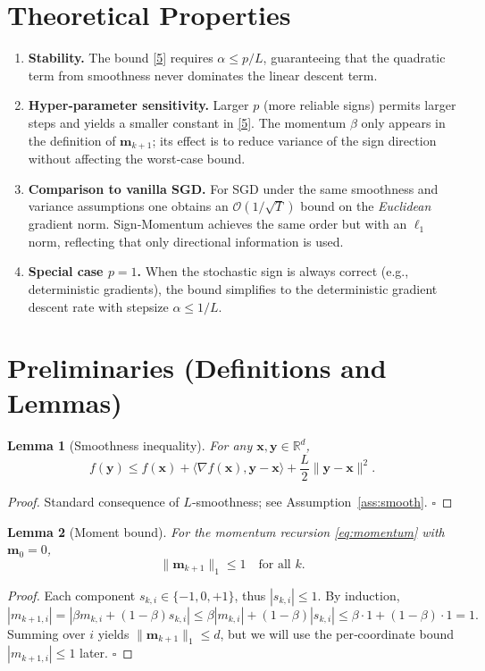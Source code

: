 \documentclass{article}
\newtheorem{lemma}{Lemma}
\begin{document}
\section*{Theoretical Properties}
\begin{enumerate}[label=\arabic*.]
\item \textbf{Stability.} The bound \eqref{5} requires $\alpha\le p/L$, guaranteeing that the quadratic term from smoothness never dominates the linear descent term.
\item \textbf{Hyper‑parameter sensitivity.} Larger $p$ (more reliable signs) permits larger steps and yields a smaller constant in \eqref{5}. The momentum $\beta$ only appears in the definition of $\mathbf{m}_{k+1}$; its effect is to reduce variance of the sign direction without affecting the worst‑case bound.
\item \textbf{Comparison to vanilla SGD.} For SGD under the same smoothness and variance assumptions one obtains an $\mathcal{O}(1/\sqrt{T})$ bound on the \emph{Euclidean} gradient norm. Sign‑Momentum achieves the same order but with an $\ell_{1}$ norm, reflecting that only directional information is used.
\item \textbf{Special case $p=1$.} When the stochastic sign is always correct (e.g., deterministic gradients), the bound simplifies to the deterministic gradient descent rate with stepsize $\alpha\le 1/L$.
\end{enumerate}

\section*{Preliminaries (Definitions and Lemmas)}
\begin{lemma}[Smoothness inequality]\label{lem:smooth}
For any $\mathbf{x},\mathbf{y}\in\mathbb{R}^{d}$,
\[
f(\mathbf{y})\le f(\mathbf{x})+\langle\nabla f(\mathbf{x}),\mathbf{y}-\mathbf{x}\rangle
+\frac{L}{2}\|\mathbf{y}-\mathbf{x}\|^{2}.
\]
\end{lemma}
\begin{proof}
Standard consequence of $L$‑smoothness; see Assumption~\ref{ass:smooth}. \hfill $\square$
\end{proof}

\begin{lemma}[Moment bound]\label{lem:mombound}
For the momentum recursion \eqref{eq:momentum} with $\mathbf{m}_{0}=0$,
\[
\|\mathbf{m}_{k+1}\|_{1}\le 1\quad\text{for all }k.
\]
\end{lemma}
\begin{proof}
Each component $s_{k,i}\in\{-1,0,+1\}$, thus $|s_{k,i}|\le1$. By induction,
\[
|m_{k+1,i}|=|\beta m_{k,i}+(1-\beta)s_{k,i}|
\le \beta|m_{k,i}|+(1-\beta)|s_{k,i}|
\le \beta\cdot1+(1-\beta)\cdot1=1.
\]
Summing over $i$ yields $\|\mathbf{m}_{k+1}\|_{1}\le d$, but we will use the per‑coordinate bound $|m_{k+1,i}|\le1$ later. \hfill $\square$
\end{proof}
\end{document}
